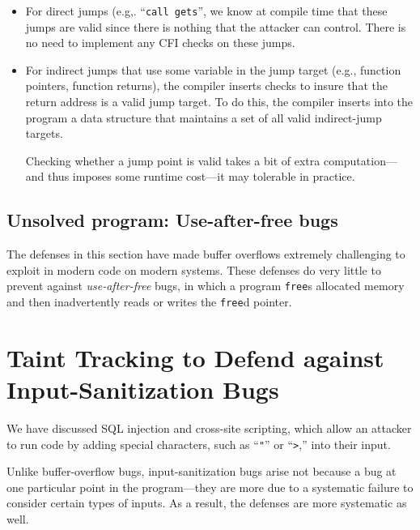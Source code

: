 \documentclass[
  letterpaper,
]{scrbook}
\theoremstyle{definition}
\theoremstyle{plain}
\theoremstyle{plain}
\theoremstyle{remark}
\begin{document}
\begin{itemize}
\item
  For direct jumps (e.g,. ``\texttt{call\ gets}'', we know at compile
  time that these jumps are valid since there is nothing that the
  attacker can control. There is no need to implement any CFI checks on
  these jumps.
\item
  For indirect jumps that use some variable in the jump target (e.g.,
  function pointers, function returns), the compiler inserts checks to
  insure that the return address is a valid jump target. To do this, the
  compiler inserts into the program a data structure that maintains a
  set of all valid indirect-jump targets.


  Checking whether a jump point is valid takes a bit of extra
  computation---and thus imposes some runtime cost---it may tolerable in
  practice.
\end{itemize}

\subsection{Unsolved program: Use-after-free
bugs}\label{unsolved-program-use-after-free-bugs}

The defenses in this section have made buffer overflows extremely
challenging to exploit in modern code on modern systems. These defenses
do very little to prevent against \emph{use-after-free} bugs, in which a
program \texttt{free}s allocated memory and then inadvertently reads or
writes the \texttt{free}d pointer.

\section{Taint Tracking to Defend against Input-Sanitization
Bugs}\label{taint-tracking-to-defend-against-input-sanitization-bugs}

We have discussed SQL injection and cross-site scripting, which allow an
attacker to run code by adding special characters, such as
``\texttt{"}'' or ``\texttt{\textgreater{}},'' into their input.

Unlike buffer-overflow bugs, input-sanitization bugs arise not because a
bug at one particular point in the program---they are more due to a
systematic failure to consider certain types of inputs. As a result, the
defenses are more systematic as well.
\end{document}
